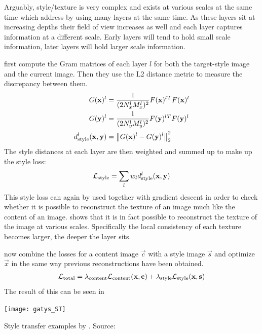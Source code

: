 Arguably, style/texture is very complex and exists at various scales at the same time which \citeauthor*{gatys} address by using many layers at the same time.
As these layers sit at increasing depths their field of view increases as well and each layer captures information at a different scale.
Early layers will tend to hold small scale information, later layers will hold larger scale information.

\citeauthor*{gatys} first compute the Gram matrices of each layer $l$ for both the target-style image and the current image.
Then they use the L2 distance metric to measure the discrepancy between them.
\begin{align}
    G(\mathbf{x})^l & = \frac{1}{(2 N_x^l M_x^l)^2} F(\mathbf{x})^l{}^T F(\mathbf{x})^l \\
    G(\mathbf{y})^l & = \frac{1}{(2 N_y^l M_y^l)^2} F(\mathbf{y})^l{}^T F(\mathbf{y})^l \\
    d_{\text{style}}^l(\mathbf{x}, \mathbf{y}) & = \left\lVert G(\mathbf{x})^l - G(\mathbf{y})^l\right\rVert^2_2 \\
\end{align}
The style distances at each layer are then weighted and summed up to make up the style loss:
\begin{align}
    \mathcal{L}_{\text{style}} = \sum_{l} w_l d_{\text{style}}^l(\mathbf{x}, \mathbf{y})
\end{align}
This style loss can again by used together with gradient descent in order to check whether it is possible to reconstruct the texture of an image much like the content of an image.
 shows that it is in fact possible to reconstruct the texture of the image at various scales.
Specifically the local consistency of each texture becomes larger, the deeper the layer sits.

\citeauthor*{gatys} now combine the losses for a content image $\vec{c}$ with a style image $\vec{s}$ and optimize $\vec{x}$ in the same way previous reconstructions have been obtained.
\begin{align}
    \mathcal{L}_{\text{total}} = \lambda_{\text{content}} \mathcal{L}_{\text{content}}(\mathbf{x}, \mathbf{c}) + \lambda_{\text{style}} \mathcal{L}_{\text{style}}(\mathbf{x}, \mathbf{s})
\end{align}
The result of this can be seen in 
\begin{marginfigure}
    \texttt{[image: gatys\_ST]}
    \caption{Style transfer examples by \citeauthor*{gatys}. Source:~\cite{gatys}}
\end{marginfigure}

